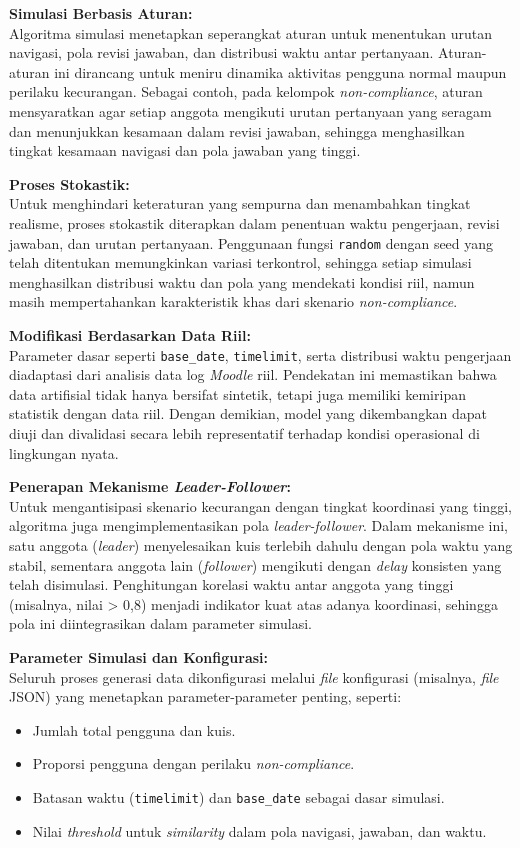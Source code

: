 \textbf{Simulasi Berbasis Aturan:} \\
Algoritma simulasi menetapkan seperangkat aturan untuk menentukan urutan navigasi, pola revisi jawaban, dan distribusi waktu antar pertanyaan. Aturan-aturan ini dirancang untuk meniru dinamika aktivitas pengguna normal maupun perilaku kecurangan. Sebagai contoh, pada kelompok \textit{non-compliance}, aturan mensyaratkan agar setiap anggota mengikuti urutan pertanyaan yang seragam dan menunjukkan kesamaan dalam revisi jawaban, sehingga menghasilkan tingkat kesamaan navigasi dan pola jawaban yang tinggi.

\textbf{Proses Stokastik:} \\
Untuk menghindari keteraturan yang sempurna dan menambahkan tingkat realisme, proses stokastik diterapkan dalam penentuan waktu pengerjaan, revisi jawaban, dan urutan pertanyaan. Penggunaan fungsi \texttt{random} dengan seed yang telah ditentukan memungkinkan variasi terkontrol, sehingga setiap simulasi menghasilkan distribusi waktu dan pola yang mendekati kondisi riil, namun masih mempertahankan karakteristik khas dari skenario \textit{non-compliance}.

\textbf{Modifikasi Berdasarkan Data Riil:} \\
Parameter dasar seperti \texttt{base\_date}, \texttt{timelimit}, serta distribusi waktu pengerjaan diadaptasi dari analisis data log \textit{Moodle} riil. Pendekatan ini memastikan bahwa data artifisial tidak hanya bersifat sintetik, tetapi juga memiliki kemiripan statistik dengan data riil. Dengan demikian, model yang dikembangkan dapat diuji dan divalidasi secara lebih representatif terhadap kondisi operasional di lingkungan nyata.

\textbf{Penerapan Mekanisme \textit{Leader-Follower}:} \\
Untuk mengantisipasi skenario kecurangan dengan tingkat koordinasi yang tinggi, algoritma juga mengimplementasikan pola \textit{leader-follower}. Dalam mekanisme ini, satu anggota (\textit{leader}) menyelesaikan kuis terlebih dahulu dengan pola waktu yang stabil, sementara anggota lain (\textit{follower}) mengikuti dengan \textit{delay} konsisten yang telah disimulasi. Penghitungan korelasi waktu antar anggota yang tinggi (misalnya, nilai > 0,8) menjadi indikator kuat atas adanya koordinasi, sehingga pola ini diintegrasikan dalam parameter simulasi.

\textbf{Parameter Simulasi dan Konfigurasi:} \\
Seluruh proses generasi data dikonfigurasi melalui \textit{file} konfigurasi (misalnya, \textit{file} JSON) yang menetapkan parameter-parameter penting, seperti:
\begin{itemize}
    \item Jumlah total pengguna dan kuis.
    \item Proporsi pengguna dengan perilaku \textit{non-compliance}.
    \item Batasan waktu (\texttt{timelimit}) dan \texttt{base\_date} sebagai dasar simulasi.
    \item Nilai \textit{threshold} untuk \textit{similarity} dalam pola navigasi, jawaban, dan waktu.
\end{itemize}

